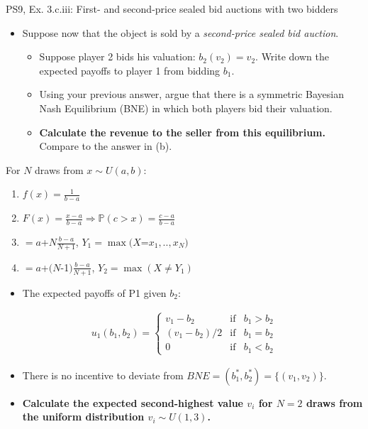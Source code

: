 \begin{frame}{PS9, Ex. 3.c.iii: First- and second-price sealed bid auctions with two bidders}
    \begin{multicols}{2}
      \begin{itemize}
        \item[(c)] Suppose now that the object is sold by a \textit{second-price sealed bid auction}.
        \begin{itemize}\normalsize
          \item[i.]   Suppose player 2 bids his valuation: $b_2(v_2) = v_2$. Write down the expected payoffs to player 1 from bidding $b_1$.
          \item[ii.]  Using your previous answer, argue that there is a symmetric Bayesian Nash Equilibrium (BNE) in which both players bid their valuation.
          \item[iii.] \textbf{Calculate the revenue to the seller from this equilibrium.} Compare to the answer in (b).
        \end{itemize}
      \end{itemize}
      For $N$ draws from $x\sim U(a, b):$
      \vspace{-6pt}
      \begin{enumerate}
        \item[PDF:] $f(x)=\frac{1}{b-a}$
        \item[CDF:] $F(x)=\frac{x-a}{b-a}\Rightarrow\mathbb{P}(c>x)=\frac{c-a}{b-a}$
        \item[$\mathbb{E}(Y_1)$] $=a$+$N\frac{b-a}{N+1}$, $Y_1=\max(X$=$x_1,..,x_N)$
        \item[$\mathbb{E}(Y_2)$] $=a$+$(N$-1$)\frac{b-a}{N+1}$, $Y_2=\max(X\neq Y_1)$
      \end{enumerate}
      \vfill\null\columnbreak
      \begin{itemize}
        \item[(i)] The expected payoffs of P1 given $b_2$:
      \end{itemize}
      \vspace{-16pt}
      \begin{align*}
        u_1(b_1,b_2)=\left\{\begin{array}{lcl}
          v_1-b_2     & \text{if} & b_1>b_2 \\
          (v_1-b_2)/2 & \text{if} & b_1=b_2 \\
          0           & \text{if} & b_1<b_2
        \end{array}\right.
      \end{align*}
      \vspace{-18pt}
      \begin{itemize}
        \item[(ii)] There is no incentive to deviate from $BNE=(b_1^*,b_2^*)=\{(v_1,v_2)\}$.
        \item[(iii)] \textbf{Calculate the expected second-highest value $v_i$ for $N=2$ draws from the uniform distribution $v_i\sim U(1,3)$.}
      \end{itemize}
      \vfill\null
    \end{multicols}
\end{frame}
